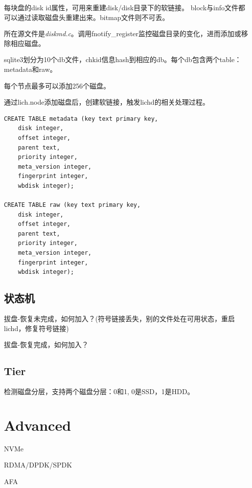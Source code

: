 每块盘的disk id属性，可用来重建disk/disk目录下的软链接。
block与info文件都可以通过读取磁盘头重建出来。bitmap文件则不可丢。

所在源文件是\emph{diskmd.c}。调用fnotify\_register监控磁盘目录的变化，进而添加或移除相应磁盘。

sqlite3划分为10个db文件，chkid信息hash到相应的db。每个db包含两个table：metadata和raw。

每个节点最多可以添加256个磁盘。

通过lich.node添加磁盘后，创建软链接，触发lichd的相关处理过程。

\begin{lstlisting}[frame=single]
CREATE TABLE metadata (key text primary key,
    disk integer,
    offset integer,
    parent text,
    priority integer,
    meta_version integer,
    fingerprint integer,
    wbdisk integer);

CREATE TABLE raw (key text primary key,
    disk integer,
    offset integer,
    parent text,
    priority integer,
    meta_version integer,
    fingerprint integer,
    wbdisk integer);
\end{lstlisting}

\subsection{状态机}

拔盘-恢复未完成，如何加入？(符号链接丢失，别的文件处在可用状态，重启lichd，修复符号链接)

拔盘-恢复完成，如何加入？

\subsection{Tier}

检测磁盘分层，支持两个磁盘分层：0和1, 0是SSD，1是HDD。

\section{Advanced}

NVMe

RDMA/DPDK/SPDK

AFA
